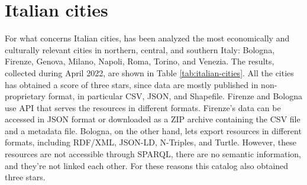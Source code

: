 \section{Italian cities}
\label{sec:italian-cities}

For what concerns Italian cities, has been analyzed the most economically and culturally relevant cities in northern, central, and southern Italy: Bologna, Firenze, Genova, Milano, Napoli, Roma, Torino, and Venezia. The results, collected during April 2022, are shown in Table \ref{tab:italian-cities}. All the cities has obtained a score of three stars, since data are mostly published in non-proprietary format, in particular \ac{CSV}, \ac{JSON}, and Shapefile. Firenze and Bologna use \acs{API} that serves the resources in different formats. Firenze's data can be accessed in \acs{JSON} format or downloaded as a ZIP archive containing the \ac{CSV} file and a metadata file. Bologna, on the other hand, lets export resources in different formats, including \ac{RDF}/\ac{XML}, \ac{JSON}-LD, N-Triples, and Turtle. However, these resources are not accessible through \ac{SPARQL}, there are no semantic information, and they're not linked each other. For these reasons this catalog also obtained three stars.

